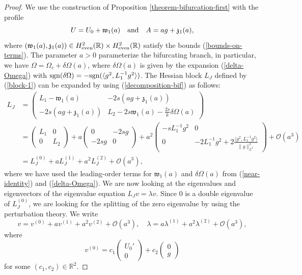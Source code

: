 \documentclass[12pt,reqno]{amsart}
\numberwithin{equation}{section}
\begin{document}
\begin{proof}
We use the construction of Proposition \ref{theorem-bifurcation-first} with the profile 
\begin{equation}
\label{decomposition-bif}
U = U_0 + \mathfrak{w}_1(a) \quad  \mbox{\rm and} \quad 
A = a g + \mathfrak{z}_1(a),
\end{equation}
where $(\mathfrak{w}_1(a), \mathfrak{z}_1(a)) \in H^2_{\rm even}(\mathbb{R}) \times H^2_{\rm even}(\mathbb{R})$ satisfy the bounds (\ref{bounds-on-terms}). The parameter $a > 0$ parameterize the bifurcating branch, 
in particular, we have $\Omega = \Omega_c + \delta \Omega(a)$, where $\delta \Omega(a)$ is given by the expansion 
(\ref{delta-Omega}) with ${\rm sgn}(\delta \Omega) = -{\rm sgn}(\langle g^2, L_1^{-1} g^2 \rangle)$. 
The Hessian block $L_J$ defined by (\ref{block-1}) can be expanded by using (\ref{decomposition-bif}) as follows:
\begin{align*}
    L_J &= \begin{pmatrix} L_1 - \mathfrak{w}_1(a) & -2 s (a g + \mathfrak{z}_1(a))  \\ 
-2 s (a g + \mathfrak{z}_1(a)) & L_2 - 2 s \mathfrak{w}_1(a) -\frac{2 s}{k} \delta\Omega(a)
\end{pmatrix} \\
&= \begin{pmatrix} L_1 & 0  \\ 
0 & L_2 \end{pmatrix} 
+ a \begin{pmatrix} 0 & -2 s g \\ 
-2 s g & 0 \end{pmatrix} 
+ a^2 \begin{pmatrix} - s L_{1}^{-1} g^2 & 0 \\ 
0 & -2 L_{1}^{-1}g^2+  2\frac{\langle g^2, L_1^{-1} g^2 \rangle}{\| g \|^2_{L^2}}  
\end{pmatrix} + \mathcal{O}(a^3) \\
&= L_J^{(0)} + a L_J^{(1)} + a^2 L_J^{(2)} + \mathcal{O}(a^3),
\end{align*}
where we have used the leading-order terms for $\mathfrak{w}_1(a)$ and $\delta \Omega(a)$ from (\ref{near-identity}) and (\ref{delta-Omega}).
We are now looking at the eigenvalues and eigenvectors of the eigenvalue equation $L_J v = \lambda v$. 
Since $0$ is a double eigenvalue of $L_J^{(0)}$, we are looking for the splitting of the zero eigenvalue 
by using the perturbation theory. We write 
$$
v = v^{(0)} + a v^{(1)} + a^2 v^{(2)} + \mathcal{O}(a^3), \quad \lambda = a \lambda^{(1)} + a^2 \lambda^{(2)} + \mathcal{O}(a^3),
$$
where
$$
v^{(0)} = c_1 \begin{pmatrix} U_0'\\0\end{pmatrix} + c_2\begin{pmatrix}0\\g\end{pmatrix}
$$
for some $(c_1,c_2) \in \mathbb{R}^2$. 



\end{proof}
\end{document}
